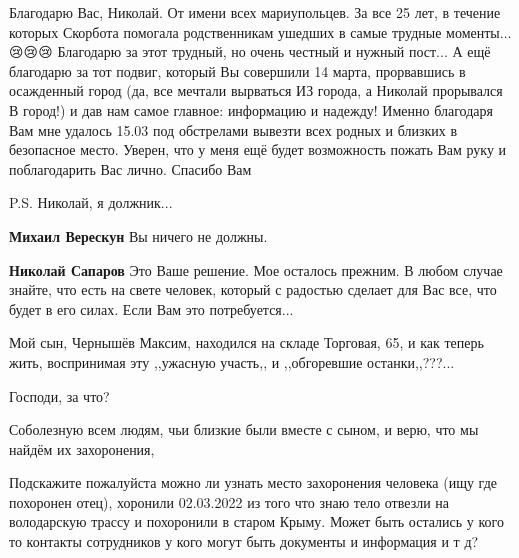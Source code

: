  
 
 
 
 

\qqSecCmt


Благодарю Вас, Николай. От имени всех мариупольцев. За все 25 лет, в течение
которых Скорбота помогала родственникам ушедших в самые трудные моменты...
😢😢😢 Благодарю за этот трудный, но очень честный и нужный пост... А ещё
благодарю за тот подвиг, который Вы совершили 14 марта, прорвавшись в
осажденный город (да, все мечтали вырваться ИЗ города, а Николай прорывался В
город!) и дав нам самое главное: информацию и надежду! Именно благодаря Вам мне
удалось 15.03 под обстрелами вывезти всех родных и близких в безопасное место.
Уверен, что у меня ещё будет возможность пожать Вам руку и поблагодарить Вас
лично. Спасибо Вам 🙏🙏🙏

P.S. Николай, я должник...

\begin{itemize} %
\textbf{Михаил Верескун} Вы ничего не должны.

\textbf{Николай Сапаров} Это Ваше решение. Мое осталось прежним. В любом случае знайте, что есть на свете человек, который с радостью сделает для Вас все, что будет в его силах. Если Вам это потребуется...

\end{itemize} %


Мой сын, Чернышёв Максим, находился на складе Торговая, 65, и как теперь жить,
воспринимая эту ,,ужасную участь,, и ,,обгоревшие останки,,???...

Господи, за что?

Соболезную всем людям, чьи близкие были вместе с сыном, и верю, что мы найдём их захоронения,🖤


Подскажите пожалуйста можно ли узнать место захоронения человека (ищу где
похоронен отец), хоронили 02.03.2022 из того что знаю тело отвезли на
володарскую трассу и похоронили в старом Крыму. Может быть остались у кого то
контакты сотрудников у кого могут быть документы и информация и т д?

